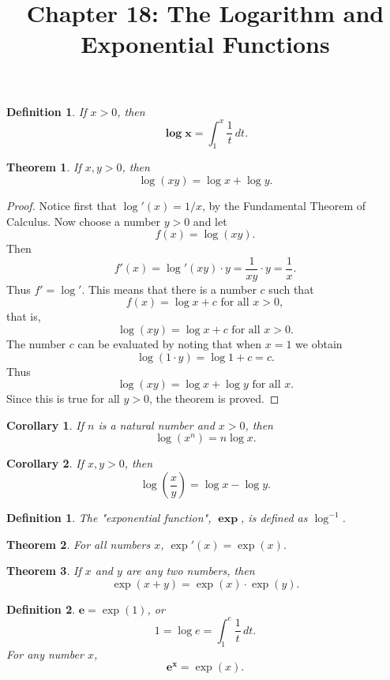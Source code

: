 \documentclass{article}
\newtheorem{corollary}{Corollary}
\newtheorem*{definition*}{Definition}
\newtheorem{definition}{Definition}
\newtheorem{theorem}{Theorem}
\begin{document}
\title{Chapter 18: The Logarithm and Exponential Functions}
\maketitle

\begin{definition*}
  If $x > 0$, then \[ \pmb{\log x} = \int_1^x \frac{1}{t} \,dt. \]
\end{definition*}

\begin{theorem}
  If $x, y > 0$, then \[ \log(xy) = \log x + \log y. \]
\end{theorem}
\begin{proof}
  Notice first that $\log'(x) = 1/x$, by the Fundamental Theorem of Calculus.
  Now choose a number $y > 0$ and let \[ f(x) = \log(xy). \] Then \[ f'(x) =
  \log'(xy) \cdot y = \frac{1}{xy} \cdot y = \frac{1}{x}. \] Thus $f' = \log'$.
  This means that there is a number $c$ such that \[
    f(x) = \log x + c
    \text{ for all } x > 0,
  \] that is, \[
    \log(xy) = \log x + c
    \text{ for all } x > 0.
  \] The number $c$ can be evaluated by noting that when $x = 1$ we obtain \[
    \log(1 \cdot y) = \log 1 + c = c.
  \] Thus \[
    \log(xy) = \log x + \log y
    \text{ for all } x.
  \] Since this is true for all $y > 0$, the theorem is proved.
\end{proof}

\begin{corollary}
  If $n$ is a natural number and $x > 0$, then \[ \log(x^n) = n\log x. \]
\end{corollary}

\begin{corollary}
  If $x, y > 0$, then \[ \log\left(\frac{x}{y}\right) = \log x - \log y. \]
\end{corollary}

\begin{definition}
  The "exponential function", $\pmb{\exp}$, is defined as $\log^{-1}$.
\end{definition}

\begin{theorem}
  For all numbers $x$, $\exp'(x) = \exp(x)$.
\end{theorem}

\begin{theorem}
  If $x$ and $y$ are any two numbers, then \[ \exp(x + y) = \exp(x) \cdot
  \exp(y). \]
\end{theorem}

\begin{definition}
  $\pmb{e} = \exp(1)$, or \[ 1 = \log e = \int_1^e \frac{1}{t} \,dt. \] For any
  number $x$, \[ \pmb{e^x} = \exp(x). \]
\end{definition}
\end{document}

